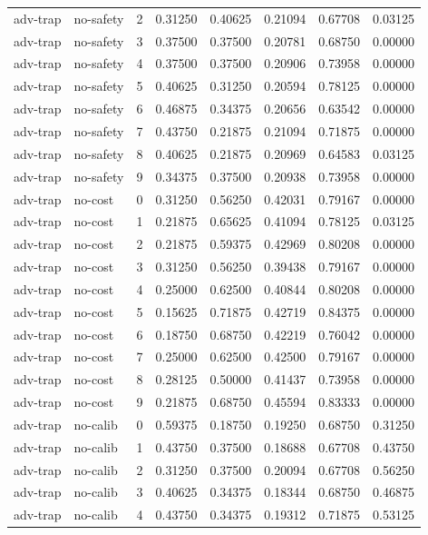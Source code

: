 \documentclass{article}
\begin{document}
\begin{center}
\begin{longtable}{llllllll}
adv-trap & no-safety & 2 & 0.31250 & 0.40625 & 0.21094 & 0.67708 & 0.03125 \\
adv-trap & no-safety & 3 & 0.37500 & 0.37500 & 0.20781 & 0.68750 & 0.00000 \\
adv-trap & no-safety & 4 & 0.37500 & 0.37500 & 0.20906 & 0.73958 & 0.00000 \\
adv-trap & no-safety & 5 & 0.40625 & 0.31250 & 0.20594 & 0.78125 & 0.00000 \\
adv-trap & no-safety & 6 & 0.46875 & 0.34375 & 0.20656 & 0.63542 & 0.00000 \\
adv-trap & no-safety & 7 & 0.43750 & 0.21875 & 0.21094 & 0.71875 & 0.00000 \\
adv-trap & no-safety & 8 & 0.40625 & 0.21875 & 0.20969 & 0.64583 & 0.03125 \\
adv-trap & no-safety & 9 & 0.34375 & 0.37500 & 0.20938 & 0.73958 & 0.00000 \\
adv-trap & no-cost & 0 & 0.31250 & 0.56250 & 0.42031 & 0.79167 & 0.00000 \\
adv-trap & no-cost & 1 & 0.21875 & 0.65625 & 0.41094 & 0.78125 & 0.03125 \\
adv-trap & no-cost & 2 & 0.21875 & 0.59375 & 0.42969 & 0.80208 & 0.00000 \\
adv-trap & no-cost & 3 & 0.31250 & 0.56250 & 0.39438 & 0.79167 & 0.00000 \\
adv-trap & no-cost & 4 & 0.25000 & 0.62500 & 0.40844 & 0.80208 & 0.00000 \\
adv-trap & no-cost & 5 & 0.15625 & 0.71875 & 0.42719 & 0.84375 & 0.00000 \\
adv-trap & no-cost & 6 & 0.18750 & 0.68750 & 0.42219 & 0.76042 & 0.00000 \\
adv-trap & no-cost & 7 & 0.25000 & 0.62500 & 0.42500 & 0.79167 & 0.00000 \\
adv-trap & no-cost & 8 & 0.28125 & 0.50000 & 0.41437 & 0.73958 & 0.00000 \\
adv-trap & no-cost & 9 & 0.21875 & 0.68750 & 0.45594 & 0.83333 & 0.00000 \\
adv-trap & no-calib & 0 & 0.59375 & 0.18750 & 0.19250 & 0.68750 & 0.31250 \\
adv-trap & no-calib & 1 & 0.43750 & 0.37500 & 0.18688 & 0.67708 & 0.43750 \\
adv-trap & no-calib & 2 & 0.31250 & 0.37500 & 0.20094 & 0.67708 & 0.56250 \\
adv-trap & no-calib & 3 & 0.40625 & 0.34375 & 0.18344 & 0.68750 & 0.46875 \\
adv-trap & no-calib & 4 & 0.43750 & 0.34375 & 0.19312 & 0.71875 & 0.53125 \\

\end{longtable}
\end{center}
\end{document}

